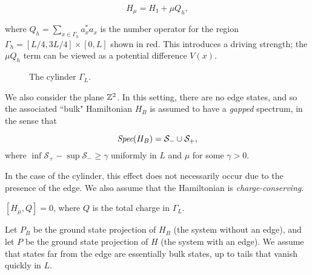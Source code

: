 \documentclass[12pt, letterpaper]{article}
\begin{document}
\[H_\mu = H_1 + \mu Q_h,\]

where $Q_h = \sum_{x \in \Gamma_h} a_x^*a_x$ is the number operator for the region $\Gamma_h = [L/4,3L/4] \times [0,L]$ shown in red. This introduces a driving strength; the $\mu Q_h$ term can be viewed as a potential difference $V(x)$.

\newpage
\begin{figure}[h!]
\centering
{}
\caption{The cylinder $\Gamma_L$.}
\label{fig:setup}
\end{figure}

We also consider the plane $\mathbb{Z}^2$. In this setting, there are no edge states, and so the associated ``bulk" Hamiltonian $H_B$ is assumed to have a \textit{gapped} spectrum, in the sense that

\begin{assumption}
\[\emph{Spec}(H_B) = \mathcal{S}_{-} \cup \mathcal{S}_{+},\]
where $\inf\mathcal{S}_{+} - \sup \mathcal{S}_{-} \geq \gamma$ uniformly in $L$ and $\mu$ for some $\gamma > 0$. 
\label{ass:gap}
\end{assumption}

In the case of the cylinder, this effect does not necessarily occur due to the presence of the edge. 
We also assume that the Hamiltonian is \emph{charge-conserving}.

\begin{assumption}
$[H_\mu, Q] = 0$, where $Q$ is the total charge in $\Gamma_L$.
\label{ass:charge}
\end{assumption}

Let $P_B$ be the ground state projection of $H_B$ (the system without an edge), and let $P$ be the ground state projection of $H$ (the system with an edge). We assume that states far from the edge are essentially bulk states, up to tails that vanish quickly in $L$.
\end{document}
